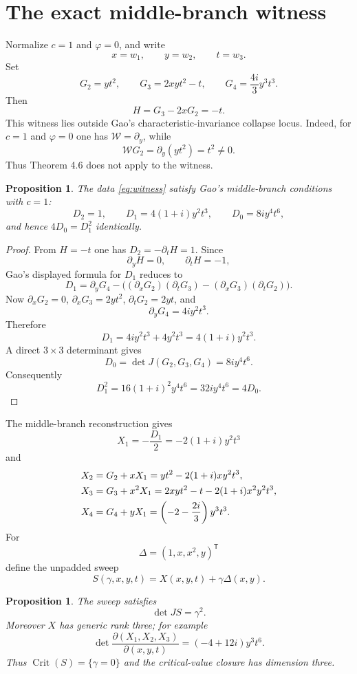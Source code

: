 \documentclass[11pt]{article}
\newtheorem{proposition}[theorem]{Proposition}
\theoremstyle{definition}
\newcommand{\Crit}{\operatorname{Crit}}
\begin{document}
\section{The exact middle-branch witness}

Normalize $c=1$ and $\varphi=0$, and write
\[
x=w_1,\qquad y=w_2,\qquad t=w_3.
\]
Set
\begin{equation}
\boxed{
G_2=yt^2,
\qquad
G_3=2xyt^2-t,
\qquad
G_4=\frac{4i}{3}y^3t^3.
}
\label{eq:witness}
\end{equation}
Then
\[
H=G_3-2xG_2=-t.
\]
This witness lies outside Gao's characteristic-invariance collapse locus. Indeed, for $c=1$ and $\varphi=0$ one has $\mathcal W=\partial_y$, while
\[
\mathcal W G_2=\partial_y(yt^2)=t^2\neq0.
\]
Thus Theorem 4.6 does not apply to the witness.

\begin{proposition}\label{prop:master}
The data \eqref{eq:witness} satisfy Gao's middle-branch conditions with $c=1$:
\[
D_2=1,
\qquad
D_1=4(1+i)y^2t^3,
\qquad
D_0=8iy^4t^6,
\]
and hence $4D_0=D_1^2$ identically.
\end{proposition}

\begin{proof}
From $H=-t$ one has $D_2=-\partial_tH=1$. Since
\[
\partial_yH=0,
\qquad
\partial_tH=-1,
\]
Gao's displayed formula for $D_1$ reduces to
\[
D_1=\partial_yG_4
-\bigl((\partial_xG_2)(\partial_tG_3)
-(\partial_xG_3)(\partial_tG_2)\bigr).
\]
Now $\partial_xG_2=0$, $\partial_xG_3=2yt^2$, $\partial_tG_2=2yt$, and
\[
\partial_yG_4=4iy^2t^3.
\]
Therefore
\[
D_1=4iy^2t^3+4y^2t^3=4(1+i)y^2t^3.
\]
A direct $3\times3$ determinant gives
\[
D_0=\det J(G_2,G_3,G_4)=8iy^4t^6.
\]
Consequently
\[
D_1^2=16(1+i)^2y^4t^6=32iy^4t^6=4D_0.
\]
\end{proof}

The middle-branch reconstruction gives
\[
X_1=-\frac{D_1}{2}=-2(1+i)y^2t^3
\]
and
\begin{align}
X_2&=G_2+xX_1
=yt^2-2(1+i)xy^2t^3,\notag\\
X_3&=G_3+x^2X_1
=2xyt^2-t-2(1+i)x^2y^2t^3,\notag\\
X_4&=G_4+yX_1
=\left(-2-\frac{2i}{3}\right)y^3t^3.
\label{eq:X}
\end{align}
For
\[
\Delta=(1,x,x^2,y)^{\mathsf T}
\]
define the unpadded sweep
\[
S(\gamma,x,y,t)=X(x,y,t)+\gamma\Delta(x,y).
\]

\begin{proposition}\label{prop:sweep}
The sweep satisfies
\[
\det JS=\gamma^2.
\]
Moreover $X$ has generic rank three; for example
\[
\det\frac{\partial(X_1,X_2,X_3)}{\partial(x,y,t)}
=(-4+12i)y^3t^6.
\]
Thus $\Crit(S)=\{\gamma=0\}$ and the critical-value closure has dimension three.
\end{proposition}
\end{document}

